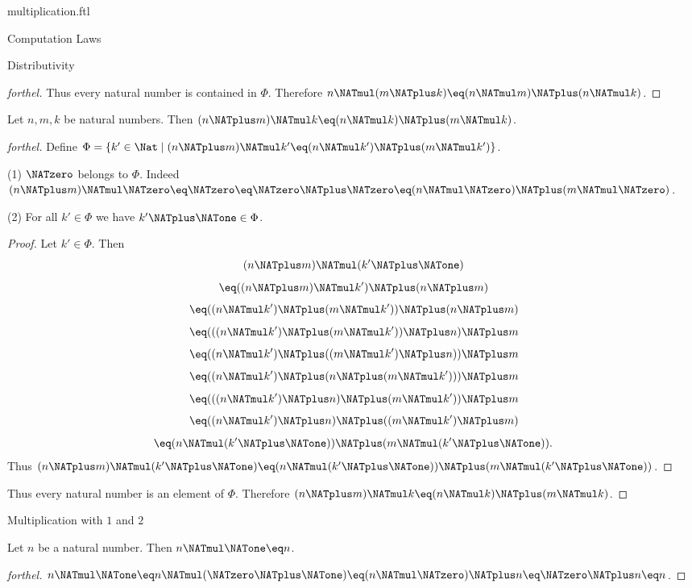 \documentclass{naproche-library}
\begin{document}
\begin{smodule}[title=Multiplication]{multiplication.ftl}
\begin{sfragment}{Computation Laws}
\begin{sfragment}{Distributivity}
\begin{proof}[forthel]
      Thus every natural number is contained in $\Phi$.
      Therefore $n \NATmul (m \NATplus k) \eq (n \NATmul m) \NATplus (n \NATmul k)$.
    \end{proof}

    \begin{proposition}[forthel,id=ARITHMETIC_06_5742967566368768]
      Let $n, m, k$ be natural numbers.
      Then $(n \NATplus m) \NATmul k \eq (n \NATmul k) \NATplus (m \NATmul k)$.
    \end{proposition}
    \begin{proof}[forthel]
      Define $\Phi = \{ k' \in \Nat \mid (n \NATplus m) \NATmul k' \eq (n \NATmul k') \NATplus (m \NATmul k') \}$.

      (1) $\NATzero$ belongs to $\Phi$.
      Indeed $(n \NATplus m) \NATmul \NATzero
        \eq \NATzero
        \eq \NATzero \NATplus \NATzero
        \eq (n \NATmul \NATzero) \NATplus (m \NATmul \NATzero)$.

      (2) For all $k' \in \Phi$ we have $k' \NATplus \NATone \in \Phi$.
      \begin{proof}
        Let $k' \in \Phi$.
        Then
        \[  (n \NATplus m) \NATmul (k' \NATplus \NATone)                        \]
        \[    \eq ((n \NATplus m) \NATmul k') \NATplus (n \NATplus m)              \]
        \[    \eq ((n \NATmul k') \NATplus (m \NATmul k')) \NATplus (n \NATplus m)   \]
        \[    \eq (((n \NATmul k') \NATplus (m \NATmul k')) \NATplus n) \NATplus m   \]
        \[    \eq ((n \NATmul k') \NATplus ((m \NATmul k') \NATplus n)) \NATplus m   \]
        \[    \eq ((n \NATmul k') \NATplus (n \NATplus (m \NATmul k'))) \NATplus m   \]
        \[    \eq (((n \NATmul k') \NATplus n) \NATplus (m \NATmul k')) \NATplus m   \]
        \[    \eq ((n \NATmul k') \NATplus n) \NATplus ((m \NATmul k') \NATplus m)   \]
        \[    \eq (n \NATmul (k' \NATplus \NATone)) \NATplus (m \NATmul (k' \NATplus \NATone)).  \]
        Thus $(n \NATplus m) \NATmul (k' \NATplus \NATone) \eq (n \NATmul (k' \NATplus \NATone)) \NATplus (m \NATmul (k' \NATplus \NATone))$.
      \end{proof}

      Thus every natural number is an element of $\Phi$.
      Therefore $(n \NATplus m) \NATmul k \eq (n \NATmul k) \NATplus (m \NATmul k)$.
    \end{proof}
  \end{sfragment}

  \begin{sfragment}{Multiplication with $1$ and $2$}
    \begin{proposition}[forthel,id=ARITHMETIC_06_2910559821365248]
      Let $n$ be a natural number.
      Then $n \NATmul \NATone \eq n$.
    \end{proposition}
    \begin{proof}[forthel]
      $n \NATmul \NATone
        \eq n \NATmul (\NATzero \NATplus \NATone)
        \eq (n \NATmul \NATzero) \NATplus n
        \eq \NATzero \NATplus n
        \eq n$.
    \end{proof}


\end{sfragment}
\end{sfragment}
\end{smodule}
\end{document}
